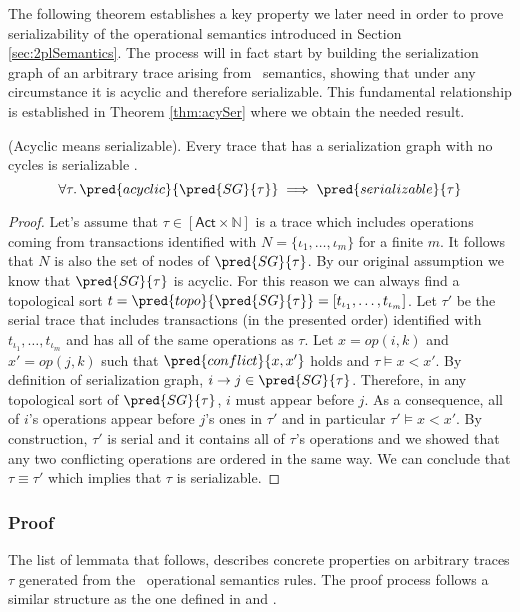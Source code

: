 The following theorem establishes a key property we later need in order to prove serializability of the operational semantics introduced in Section \ref{sec:2plSemantics}. The process will in fact start by building the serialization graph of an arbitrary trace arising from \tpl\ semantics, showing that under any circumstance it is acyclic and therefore serializable. This fundamental relationship is established in Theorem \ref{thm:acySer} where we obtain the needed result.
\begin{thm}
	\label{thm:acySer}
	(Acyclic means serializable).
	Every trace that has a serialization graph with no cycles is serializable \cite{ccontrol}.
	\[
		\forall \tau \ldotp \pred{acyclic}{\pred{SG}{\tau}} \implies \pred{serializable}{\tau}
	\]
	
	\begin{proof}
	Let's assume that $\tau \in [\mathsf{Act} \times \mathds{N}]$ is a trace which includes operations coming from transactions identified with $N = \{ \iota_1, \ldots, \iota_m \}$ for a finite $m$. It follows that $N$ is also the set of nodes of $\pred{SG}{\tau}$. By our original assumption we know that $\pred{SG}{\tau}$ is acyclic. For this reason we can always find a topological sort $t = \pred{topo}{\pred{SG}{\tau}} = [t_{\iota_1}, \ldots, t_{\iota_m}]$. Let $\tau'$ be the serial trace that includes transactions (in the presented order) identified with $t_{\iota_1}, \ldots, t_{\iota_m}$ and has all of the same operations as $\tau$. Let $x = op(i, k)$ and $x' = op(j, k)$ such that $\pred{conflict}{x, x'}$ holds and $\tau \vDash x < x'$. By definition of serialization graph, $i \rightarrow j \in \pred{SG}{\tau}$. Therefore, in any topological sort of $\pred{SG}{\tau}$, $i$ must appear before $j$. As a consequence, all of $i$'s operations appear before $j$'s ones in $\tau'$ and in particular $\tau' \vDash x < x'$. By construction, $\tau'$ is serial and it contains all of $\tau$'s operations and we showed that any two conflicting operations are ordered in the same way. We can conclude that $\tau \equiv \tau'$ which implies that $\tau$ is serializable.
	\end{proof}
\end{thm}

\tocless\subsubsection{Proof}

The list of lemmata that follows, describes concrete properties on arbitrary traces $\tau$ generated from the \tpl\ operational semantics rules. The proof process follows a similar structure as the one defined in \cite{papa} and \cite{ccontrol}.

